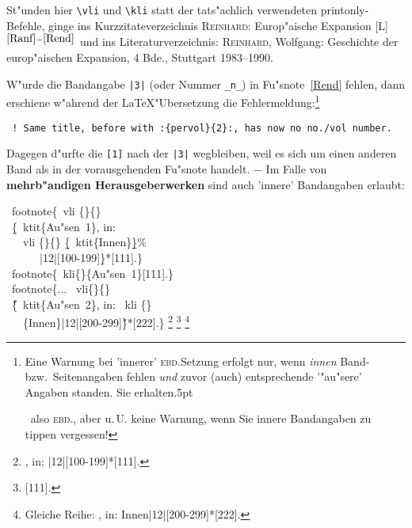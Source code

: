 \documentclass[12pt,a4paper]{article}
\newcommand{\pdfko}[1]{\kern #1pt
                          \strut\ignorespaces}%
\newcommand{\pbs}{\string\ \unskip}
\newcommand{\bs}{\protect\pbs}
\begin{document}
\noindent
St"unden hier \verb|\vli| und \verb|\kli| statt der
tats"achlich verwendeten printonly-Befehle, ginge ins Kurzzitateverzeichnis  
\textsc{Reinhard}: Europ"aische Expansion [L] \hspace{.5em} 
\textsf{\pageref{Ranf}$^{\ref{Ranf}-\ref{Rend}}$} 
und ins Literaturverzeichnis: 
\textsc{Reinhard}, Wolfgang: Geschichte der europ"aischen Expansion, 
4 Bde., Stuttgart 1983--1990.

\vspace{.1ex}
W"urde die Bandangabe \verb+|3|+ \hspace{.1em}(oder Nummer \hspace{-.3em}\verb+_n_+)\hspace{.1em} in 
Fu"snote~\ref{Rend} fehlen, dann erschiene w"ahrend der \LaTeX\hy "Ubersetzung die 
Fehlermeldung:\footnote{Eine Warnung bei 'innerer' \textsc{ebd.}\hy Setzung erfolgt nur,
wenn \textit{innen} Band- bzw.\ Seitenangaben fehlen
\textit{und} zuvor (auch) entsprechende '"au"sere' Angaben standen. Sie erhalten\pdfko{.5}\
also \textsc{ebd.}, aber u.\,U. keine Warnung, wenn Sie innere 
Bandangaben zu tippen vergessen!}

\vspace{.5ex}\noindent 
\label{pervol}%
{\small\texttt{ !~Same title, before with :\{pervol\}\{2\}:, has now no no./vol number.}}

\vspace{.75ex}\noindent
Dagegen d"urfte die \verb|[1]| nach der \verb+|3|+ wegbleiben, weil es 
sich um einen anderen Band als in der vorausgehenden 
Fu"snote handelt. $-$ Im Falle von \textbf{mehrb"andigen Herausgeberwerken}
sind auch 'innere' Bandangaben erlaubt:

\vspace{-.2ex}%
\Doppelbox
{\vspace{1.75ex}\bs footnote\{\bs vli \{\}\{\}
 \\ \ \b{\{}\bs ktit\{Au"sen~1\}, in:
 \\ \ \ \bs vli \{\}\{\} \b{\b{\{}}\bs ktit\{Innen\}\b{\b{\}}}\%
 \\ \ \ \ \ \ \ \string|12\string|[100-199]\b{\}}*[111].\}
 \\[.5ex] \bs footnote\{\bs kli\{\}\{Au"sen~1\}[111].\}
 \\[.5ex] \bs footnote\{... \bs vli\{\}\{\}
 \\ \ \H{\{}\bs ktit\{Au"sen~2\}, in: \bs kli \{\} 
 \\ \ \ \ \{Innen\}\string|12\string|[200-299]\H{\}}*[222].\}
}
{\footnote{\notktitaddtok\printonlyvli {}{}%
  {, in:
    \printonlyvli {}{}
        {}%
          |12|[100-199]}*[111].}
 \footnote{[111].}
 \footnote{Gleiche Reihe: \notktitaddtok\printonlyvli{}{}
        {, in:
    \printonlykli {} {Innen}|12|[200-299]}*[222].}
}
\end{document}
